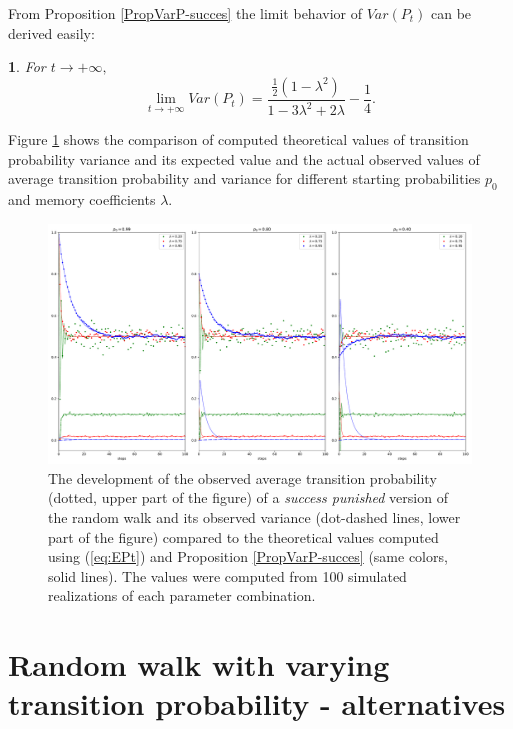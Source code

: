 \documentclass{amsart}
\theoremstyle{definition}
\theoremstyle{plain}
\theoremstyle{plain}
\newtheorem{cor}[thm]{\protect\corollaryname}
\numberwithin{equation}{section}
\providecommand{\corollaryname}{Corollary}
\begin{document}
From Proposition \ref{PropVarP-succes} the limit behavior of $Var(P_{t})$
can be derived easily:

\begin{cor}
For $t\rightarrow+\infty,$ \textup{
\begin{equation}
\lim_{t\to+\infty}Var(P_{t})=\frac{\frac{1}{2}(1-\lambda^{2})}{1-3\lambda^{2}+2\lambda}-\frac{1}{4}.\label{eq:CoroVarpt-statement}
\end{equation}
}
\end{cor}

Figure \ref{fig:The-development-punished} shows the comparison of
computed theoretical values of transition probability variance and
its expected value and the actual observed values of average transition
probability and variance for different starting probabilities $p_{0}$
and memory coefficients $\lambda$.

\begin{figure}
 \begin{center}
\includegraphics[width=1\textwidth]{../simulations/ept_100_walks_100_steps_type_success_punished}
\caption{\label{fig:The-development-punished}The development of the observed
average transition probability (dotted, upper part of the figure)
of a \emph{success punished} version of the random walk and its observed
variance (dot-dashed lines, lower part of the figure) compared to
the theoretical values computed using (\ref{eq:EPt}) and Proposition
\ref{PropVarP-succes} (same colors, solid lines). The values were
computed from 100 simulated realizations of each parameter combination.}
 \end{center}
\end{figure}

\section{Random walk with varying transition probability - alternatives\label{sec:Random-walk-aternatives}}
\end{document}
